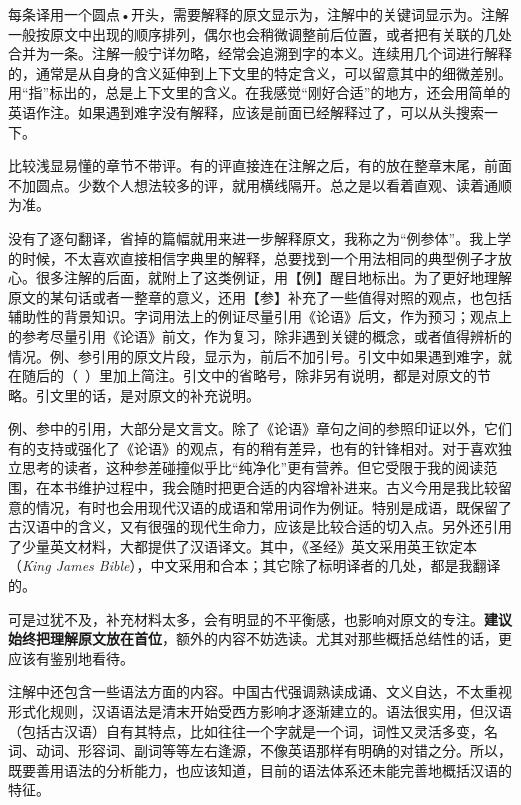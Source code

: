 每条译用一个圆点•开头，需要解释的原文显示为，注解中的关键词显示为。注解一般按原文中出现的顺序排列，偶尔也会稍微调整前后位置，或者把有关联的几处合并为一条。注解一般宁详勿略，经常会追溯到字的本义。连续用几个词进行解释的，通常是从自身的含义延伸到上下文里的特定含义，可以留意其中的细微差别。用“指”标出的，总是上下文里的含义。在我感觉“刚好合适”的地方，还会用简单的英语作注。如果遇到难字没有解释，应该是前面已经解释过了，可以从头搜索一下。

比较浅显易懂的章节不带评。有的评直接连在注解之后，有的放在整章末尾，前面不加圆点。少数个人想法较多的评，就用横线隔开。总之是以看着直观、读着通顺为准。

没有了逐句翻译，省掉的篇幅就用来进一步解释原文，我称之为“例参体”。我上学的时候，不太喜欢直接相信字典里的解释，总要找到一个用法相同的典型例子才放心。很多注解的后面，就附上了这类例证，用【例】醒目地标出。为了更好地理解原文的某句话或者一整章的意义，还用【参】补充了一些值得对照的观点，也包括辅助性的背景知识。字词用法上的例证尽量引用《论语》后文，作为预习；观点上的参考尽量引用《论语》前文，作为复习，除非遇到关键的概念，或者值得辨析的情况。例、参引用的原文片段，显示为，前后不加引号。引文中如果遇到难字，就在随后的（~）里加上简注。引文中的省略号，除非另有说明，都是对原文的节略。引文里的话，是对原文的补充说明。

例、参中的引用，大部分是文言文。除了《论语》章句之间的参照印证以外，它们有的支持或强化了《论语》的观点，有的稍有差异，也有的针锋相对。对于喜欢独立思考的读者，这种参差碰撞似乎比“纯净化”更有营养。但它受限于我的阅读范围，在本书维护过程中，我会随时把更合适的内容增补进来。古义今用是我比较留意的情况，有时也会用现代汉语的成语和常用词作为例证。特别是成语，既保留了古汉语中的含义，又有很强的现代生命力，应该是比较合适的切入点。另外还引用了少量英文材料，大都提供了汉语译文。其中，《圣经》英文采用英王钦定本（\emph{King James Bible}），中文采用和合本；其它除了标明译者的几处，都是我翻译的。

可是过犹不及，补充材料太多，会有明显的不平衡感，也影响对原文的专注。\textbf{建议始终把理解原文放在首位}，额外的内容不妨选读。尤其对那些概括总结性的话，更应该有鉴别地看待。

注解中还包含一些语法方面的内容。中国古代强调熟读成诵、文义自达，不太重视形式化规则，汉语语法是清末开始受西方影响才逐渐建立的。语法很实用，但汉语（包括古汉语）自有其特点，比如往往一个字就是一个词，词性又灵活多变，名词、动词、形容词、副词等等左右逢源，不像英语那样有明确的对错之分。所以，既要善用语法的分析能力，也应该知道，目前的语法体系还未能完善地概括汉语的特征。

